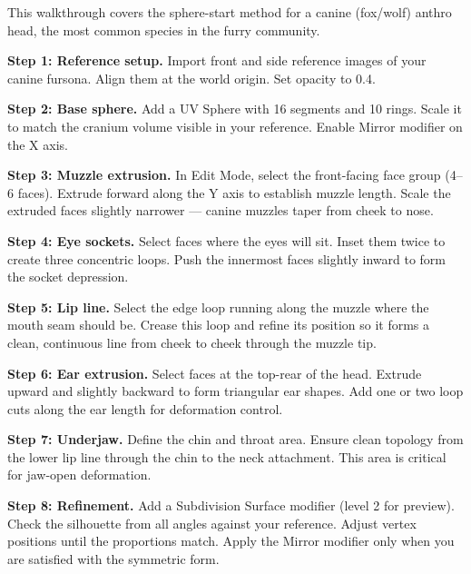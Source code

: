 \begin{furrybox}[title={\sffamily\bfseries\small\textcolor{white}{Worked Example --- Canine Head from Sphere Start}}]
This walkthrough covers the sphere-start method for a canine (fox/wolf) anthro head, the most common species in the furry community.

\textbf{Step 1: Reference setup.}
Import front and side reference images of your canine fursona. Align them at the world origin. Set opacity to 0.4.

\textbf{Step 2: Base sphere.}
Add a UV Sphere with 16 segments and 10 rings. Scale it to match the cranium volume visible in your reference. Enable Mirror modifier on the X axis.

\textbf{Step 3: Muzzle extrusion.}
In Edit Mode, select the front-facing face group (4--6 faces). Extrude forward along the Y axis to establish muzzle length. Scale the extruded faces slightly narrower --- canine muzzles taper from cheek to nose.

\textbf{Step 4: Eye sockets.}
Select faces where the eyes will sit. Inset them twice to create three concentric loops. Push the innermost faces slightly inward to form the socket depression.

\textbf{Step 5: Lip line.}
Select the edge loop running along the muzzle where the mouth seam should be. Crease this loop and refine its position so it forms a clean, continuous line from cheek to cheek through the muzzle tip.

\textbf{Step 6: Ear extrusion.}
Select faces at the top-rear of the head. Extrude upward and slightly backward to form triangular ear shapes. Add one or two loop cuts along the ear length for deformation control.

\textbf{Step 7: Underjaw.}
Define the chin and throat area. Ensure clean topology from the lower lip line through the chin to the neck attachment. This area is critical for jaw-open deformation.

\textbf{Step 8: Refinement.}
Add a Subdivision Surface modifier (level 2 for preview). Check the silhouette from all angles against your reference. Adjust vertex positions until the proportions match. Apply the Mirror modifier only when you are satisfied with the symmetric form.
\end{furrybox}



